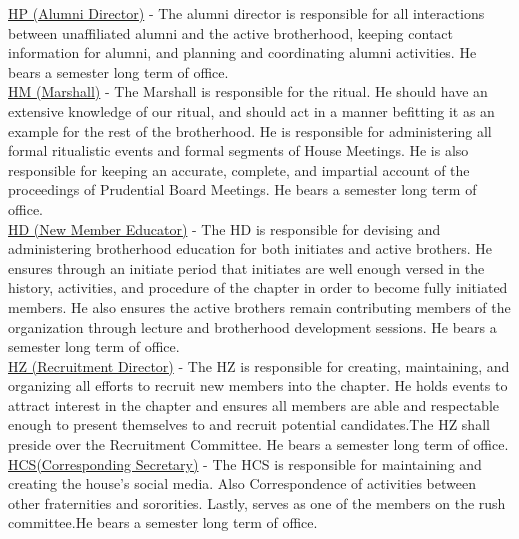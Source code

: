 \documentclass{article}
\begin{document}
\underline{HP (Alumni Director)} - The alumni director is responsible for all interactions between unaffiliated alumni and the active brotherhood, keeping contact information for alumni, and planning and coordinating alumni activities. He bears a semester long term of office.\\

\underline{HM (Marshall)} - The Marshall is responsible for the ritual. He should have an extensive knowledge of our ritual, and should act in a manner befitting it as an example for the rest of the brotherhood. He is responsible for administering all formal ritualistic events and formal segments of House Meetings. He is also responsible for keeping an accurate, complete, and impartial account of the proceedings of Prudential Board Meetings. He bears a semester long term of office. \\

\underline{HD (New Member Educator)} - The HD is responsible for devising and administering brotherhood education for both initiates and active brothers. He ensures through an initiate   period that initiates are well enough versed in the history, activities, and procedure of the chapter in order to become fully initiated members. He also ensures the active brothers remain contributing members of the organization through lecture and brotherhood development sessions. He bears a semester long term of office.\\

\underline{HZ (Recruitment Director)} - The HZ is responsible for creating, maintaining, and organizing all efforts to recruit new members into the chapter. He holds events to attract interest in the chapter and ensures all members are able and respectable enough to present themselves to and recruit potential candidates.The HZ shall preside over the Recruitment Committee. He bears a semester long term of office.\\

\underline{HCS(Corresponding Secretary)} - The HCS is responsible for maintaining and creating the house's social media. Also Correspondence of activities between other fraternities and sororities. Lastly, serves as one of the members on the rush committee.He bears a semester long term of office.
\end{document}
